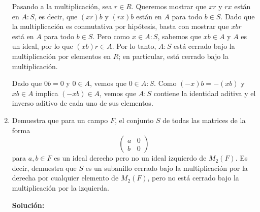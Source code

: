 \begin{enumerate}
    Pasando a la multiplicación, sea $r \in R$. Queremos mostrar que $xr$ y $rx$ están en $A : S$, es decir, que $(xr)b$ y $(rx)b$ están en $A$ para todo $b \in S$. Dado que la multiplicación es conmutativa por hipótesis, basta con mostrar que $xbr$ está en $A$ para todo $b \in S$. Pero como $x \in A : S$, sabemos que $xb \in A$ y $A$ es un ideal, por lo que $(xb)r \in A$. Por lo tanto, $A : S$ está cerrado bajo la multiplicación por elementos en $R$; en particular, está cerrado bajo la multiplicación.

    Dado que $0b = 0$ y $0 \in A$, vemos que $0 \in A : S$. Como $(-x)b = -(xb)$ y $xb \in A$ implica $(-xb) \in A$, vemos que $A : S$ contiene la identidad aditiva y el inverso aditivo de cada uno de sus elementos.
    \item Demuestra que para un campo $F$, el conjunto $S$ de todas las matrices de la forma
    \[
    \begin{pmatrix}
    a & 0 \\
    b & 0
    \end{pmatrix}
    \]
    para $a, b \in F$ es un ideal derecho pero no un ideal izquierdo de $M_2(F)$. Es decir, demuestra que $S$ es un subanillo cerrado bajo la multiplicación por la derecha por cualquier elemento de $M_2(F)$, pero no está cerrado bajo la multiplicación por la izquierda.

    \textbf{Solución:}


\end{enumerate}
